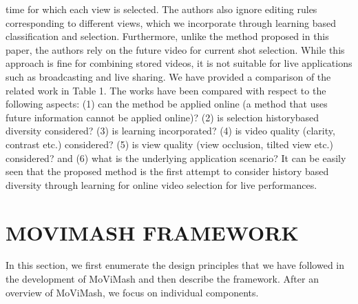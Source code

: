 \documentclass{sig-alternate}
\begin{document}
{{{time for which each view is selected. The authors also ignore editing
rules corresponding to different views, which we incorporate
through learning based classification and selection. Furthermore,
unlike the method proposed in this paper, the authors rely on the
future video for current shot selection. While this approach is fine
for combining stored videos, it is not suitable for live applications
such as broadcasting and live sharing.
We have provided a comparison of the related work in Table 1.
The works have been compared with respect to the following aspects:
(1) can the method be applied online (a method that uses future
information cannot be applied online)? (2) is selection historybased
diversity considered? (3) is learning incorporated? (4) is
video quality (clarity, contrast etc.) considered? (5) is view quality
(view occlusion, tilted view etc.) considered? and (6) what is the
underlying application scenario? It can be easily seen that the proposed
method is the first attempt to consider history based diversity
through learning for online video selection for live performances. 

\section{MOVIMASH FRAMEWORK}
In this section, we first enumerate the design principles that we
have followed in the development of MoViMash and then describe
the framework. After an overview of MoViMash, we focus on individual
components.

}}}
\end{document}
